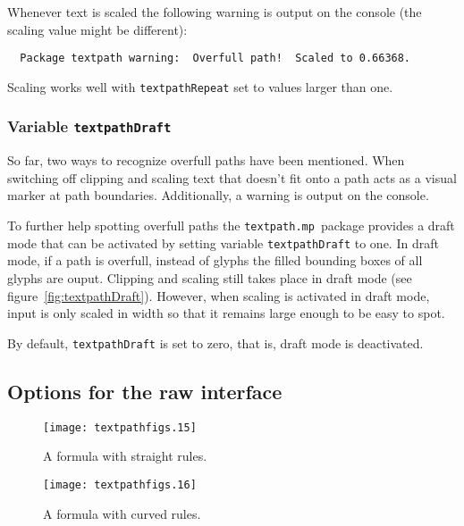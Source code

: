 \documentclass{article}
\newcommand*{\cmd}[1]{\texttt{#1}}
\newcommand*{\pkg}{\cmd{textpath.mp}}
\begin{document}
Whenever text is scaled the following warning is output on the console (the scaling value might be different):

\begin{verbatim}
  Package textpath warning:  Overfull path!  Scaled to 0.66368.
\end{verbatim}

Scaling works well with \cmd{textpathRepeat} set to values larger than one.


\subsubsection{Variable \cmd{textpathDraft}}
So far, two ways to recognize overfull paths have been mentioned.  When switching off clipping and scaling text that doesn't fit onto a path acts as a visual marker at path boundaries.  Additionally, a warning is output on the console.

To further help spotting overfull paths the \pkg\ package provides a draft mode that can be activated by setting variable \cmd{textpathDraft} to one.  In draft mode, if a path is overfull, instead of glyphs the filled bounding boxes of all glyphs are ouput.  Clipping and scaling still takes place in draft mode (see figure~\ref{fig:textpathDraft}).  However, when scaling is activated in draft mode, input is only scaled in width so that it remains large enough to be easy to spot.

By default, \cmd{textpathDraft} is set to zero, that is, draft mode is deactivated.



\subsection{Options for the raw interface}\label{sec:OptionsRaw}

\begin{figure}
\begin{minipage}[t]{.45\linewidth}
  \centering
  \texttt{[image: textpathfigs.15]}
  \caption{A formula with straight rules.}
  \label{fig:textpathFancyStrokesZero}
\end{minipage}\hfill
\begin{minipage}[t]{.45\linewidth}
  \centering
  \texttt{[image: textpathfigs.16]}
  \caption{A formula with curved rules.}
  \label{fig:textpathFancyStrokesOne}
\end{minipage}
\end{figure}
\end{document}
